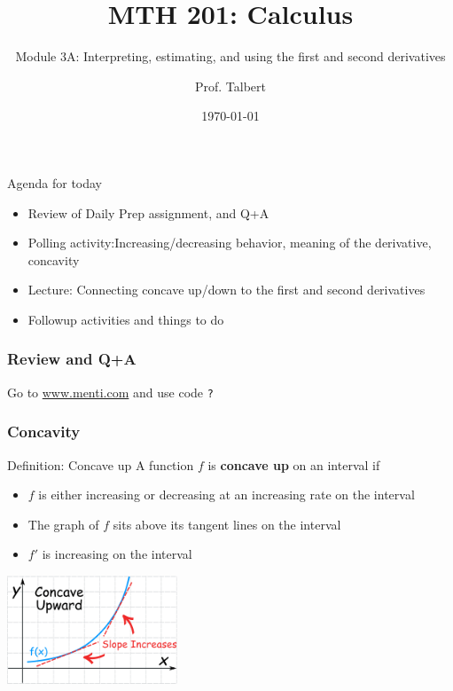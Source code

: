 \documentclass{beamer}
\title{MTH 201: Calculus}
\subtitle{Module 3A: Interpreting, estimating, and using the first and second derivatives}
\author{Prof. Talbert}
\institute{GVSU}
\date{\today}
\begin{document}
\frame{\titlepage}

\begin{frame}{Agenda for today}
    \begin{itemize}
        \item<1-> Review of Daily Prep assignment, and Q+A
        \item<2-> Polling activity:Increasing/decreasing behavior, meaning of the derivative, concavity
        \item<3-> Lecture: Connecting concave up/down to the first and second derivatives 
        \item<4-> Followup activities and things to do 
    \end{itemize}
\end{frame}

\begin{frame}
    \frametitle{Review and Q+A}

    \begin{center}
        Go to \url{www.menti.com} and use code \texttt{?}
    \end{center}

\end{frame}

\begin{frame}
    \frametitle{Concavity}

    \begin{block}{Definition: Concave up}
        A function $f$ is \textbf{concave up} on an interval if

        \begin{itemize}
            \item $f$ is either increasing or decreasing at an increasing rate on the interval
            \item The graph of $f$ sits above its tangent lines on the interval
            \item $f'$ is increasing on the interval
        \end{itemize}
    \end{block}

\begin{center}
    \includegraphics[width=2in]{concave-upward.png}
\end{center}


\end{frame}
\end{document}
